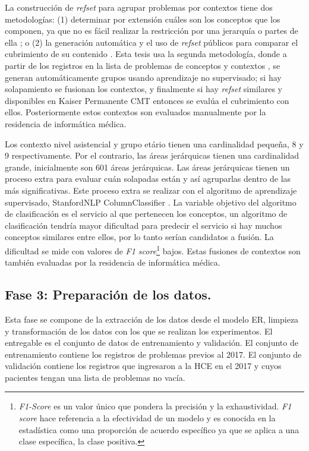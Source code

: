 La construcción de  \textit{\acrshort{refset} } para agrupar problemas por contextos tiene dos metodologías: (1) determinar por extensión cuáles son los conceptos que los componen, ya que no es fácil realizar la restricción por una jerarquía o partes de ella \cite{Hjen2014MethodsSets.,Lee2013AImplementations.}; o (2) la generación automática y el uso de \textit{\acrshort{refset} } públicos para comparar el cubrimiento de su contenido \cite{Lee2013AImplementations.}. Esta tesis usa la segunda metodología, donde a partir de los registros en la lista de problemas de conceptos y  contextos , se generan automáticamente grupos usando aprendizaje no supervisado;  si hay solapamiento se fusionan los contextos,  y finalmente si hay \textit{\acrshort{refset} } similares y disponibles en Kaiser Permanente CMT entonces se evalúa el cubrimiento con ellos.  Posteriormente estos contextos son evaluados manualmente por la residencia de informática médica.  

Los contexto  nivel asistencial y grupo etário tienen una cardinalidad pequeña, 8 y 9 respectivamente. Por el contrario, las áreas jerárquicas tienen una cardinalidad grande, inicialmente son 601 áreas jerárquicas. Las áreas jerárquicas tienen un proceso extra para evaluar  cuán solapadas están y así agruparlas dentro de las más significativas. Este proceso extra se realizar con el algoritmo de aprendizaje supervisado, StanfordNLP ColumnClassifier \cite{manning-EtAl:2014:P14-5}. La variable objetivo del algoritmo de clasificación es  el servicio al que pertenecen los conceptos, un algoritmo de clasificación tendría mayor dificultad para predecir el servicio si hay muchos conceptos similares entre ellos, por lo tanto serían candidatos a fusión. La dificultad se mide con valores de \textit{F1 score}\footnote{\textit{F1-Score} es un valor único que pondera la precisión y la exhaustividad. \textit{F1 score} hace referencia a la efectividad de un modelo y es conocida en la estadística como una proporción de acuerdo específico ya que se aplica a una clase específica, la clase positiva.\cite{Powers2011Evaluation:Correlation}} bajos. Estas fusiones de contextos son también evaluadas por la residencia de informática médica.


\subsection{Fase 3: Preparación de los datos.} Esta fase se compone de la extracción de los datos desde el modelo ER, limpieza y transformación de los datos con los que se realizan los experimentos. El entregable es el conjunto de datos de entrenamiento y validación. El conjunto de entrenamiento contiene los registros de problemas previos al 2017. El conjunto de validación contiene los registros que ingresaron a la \acrshort{HCE} en el 2017 y cuyos pacientes tengan una lista de problemas no vacía.

